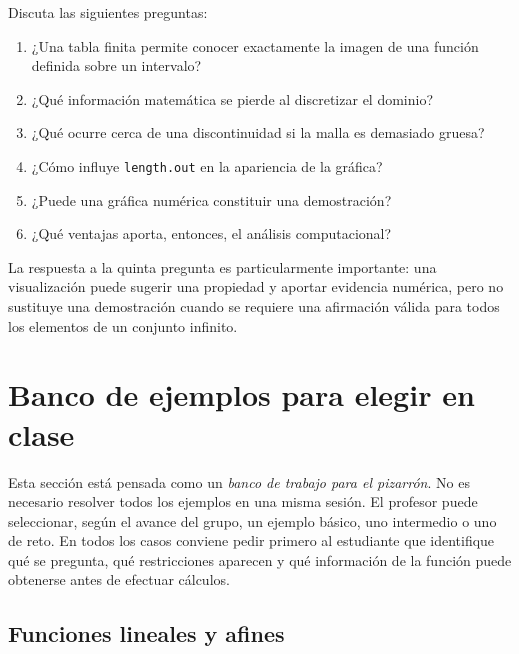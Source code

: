 \documentclass[12pt]{article}
\theoremstyle{remark}
\begin{document}
Discuta las siguientes preguntas:

\begin{enumerate}
    \item ¿Una tabla finita permite conocer exactamente la imagen de una
    función definida sobre un intervalo?
    \item ¿Qué información matemática se pierde al discretizar el dominio?
    \item ¿Qué ocurre cerca de una discontinuidad si la malla es demasiado
    gruesa?
    \item ¿Cómo influye \texttt{length.out} en la apariencia de la gráfica?
    \item ¿Puede una gráfica numérica constituir una demostración?
    \item ¿Qué ventajas aporta, entonces, el análisis computacional?
\end{enumerate}

La respuesta a la quinta pregunta es particularmente importante: una
visualización puede sugerir una propiedad y aportar evidencia numérica, pero
no sustituye una demostración cuando se requiere una afirmación válida para
todos los elementos de un conjunto infinito.


\section{Banco de ejemplos para elegir en clase}
\label{sec:banco-ejemplos}

Esta sección está pensada como un \emph{banco de trabajo para el pizarrón}. No es necesario resolver todos los ejemplos en una misma sesión. El profesor puede seleccionar, según el avance del grupo, un ejemplo básico, uno intermedio o uno de reto. En todos los casos conviene pedir primero al estudiante que identifique qué se pregunta, qué restricciones aparecen y qué información de la función puede obtenerse antes de efectuar cálculos.

\subsection*{Funciones lineales y afines}
\end{document}
